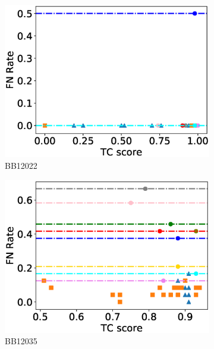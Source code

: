 \begin{figure}[!htbp]
\begin{adjustwidth}{-1cm}{-1cm}
\begin{subfigure}{0.22\textwidth}
			\includegraphics[width=\columnwidth]{Figure/summary/precomputedInit/Balibase/BB12022_fnrate_vs_tc_2}
			\caption{BB12022}
		\end{subfigure}
		\begin{subfigure}{0.22\textwidth}
			\includegraphics[width=\columnwidth]{Figure/summary/precomputedInit/Balibase/BB12035_fnrate_vs_tc_2}
			\caption{BB12035}
		\end{subfigure}	
		\begin{subfigure}{0.22\textwidth}

\end{subfigure}
\end{adjustwidth}
\end{figure}

